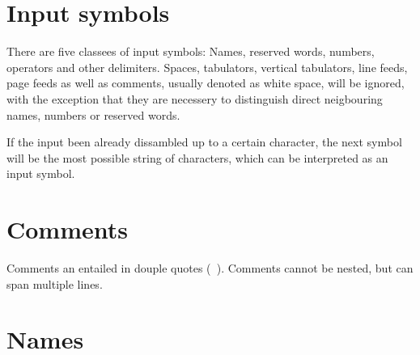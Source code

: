 \section{Input symbols}\label{sec:eingabesymbole}
\label{zweieins}

There are five classees  of input symbols:
Names, reserved words,
numbers,
operators  and  other
delimiters.  Spaces, tabulators,
vertical tabulators,
line feeds, page feeds
as well as comments,
usually denoted as white space,  will be ignored, with the exception
that they are necessery to distinguish direct neigbouring names,
numbers or reserved words.

If the input been already dissambled up to a certain character, the
next symbol will be the most possible string of characters, which can
be interpreted as an input symbol.

\section{Comments}\label{sec:kommentare}
\label{zweizwei}

Comments an entailed in douple quotes ({\tt
  \dq}).
Comments cannot be nested, but can span multiple lines.

\section{Names}\label{sec:namen}
\label{zweidrei}

